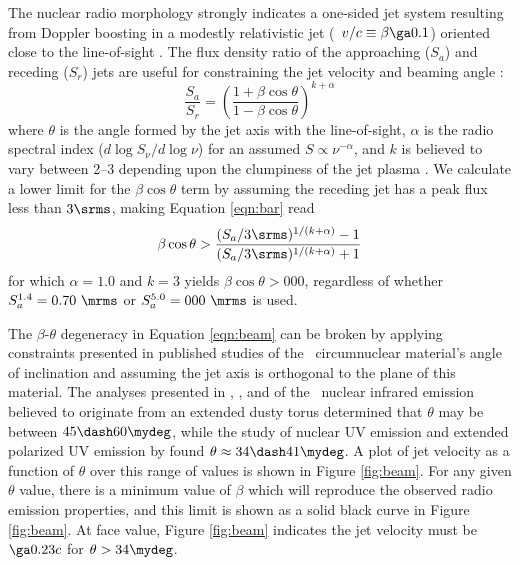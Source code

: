 \documentclass[11pt, preprint]{aastex}
\begin{document}
The nuclear radio morphology strongly indicates a one-sided jet system
resulting from Doppler boosting in a modestly relativistic jet
(\ie\ $v/c \equiv \beta \ga 0.1$) oriented close to the line-of-sight
\citep[see][for a review]{1995PASP..107..803U}. The flux density ratio
of the approaching ($S_a$) and receding ($S_r$) jets are useful for
constraining the jet velocity and beaming angle
\citep{1999ARA&A..37..409M}:
\begin{equation}
  \frac{S_a}{S_r} = \left(\frac{1+\beta \cos \theta}{1-\beta \cos
    \theta}\right)^{k+\alpha}
  \label{eqn:bar}
\end{equation}
where $\theta$ is the angle formed by the jet axis with the
line-of-sight, $\alpha$ is the radio spectral index ($d\log
S_{\nu}/d\log \nu$) for an assumed $S \propto \nu^{-\alpha}$, and $k$
is believed to vary between 2--3 depending upon the clumpiness of the
jet plasma \citep[\eg][]{1979Natur.277..182S}. We calculate a lower
limit for the $\beta \cos \theta$ term by assuming the receding jet
has a peak flux less than $3\srms$, making Equation \ref{eqn:bar} read
\begin{equation}
  \beta \cos \theta >
  \frac{(S_a/3\srms)^{1/(k+\alpha)}-1}{(S_a/3\srms)^{1/(k+\alpha)}+1}
  \label{eqn:beam}
\end{equation}
for which $\alpha = 1.0$ and $k = 3$ yields $\beta \cos \theta > 000$,
regardless of whether $S_a^{1.4} = 0.70 ~\mrms$ or $S_a^{5.0} = 000
~\mrms$ is used.

The $\beta$-$\theta$ degeneracy in Equation \ref{eqn:beam} can be
broken by applying constraints presented in published studies of the
\irs\ circumnuclear material's angle of inclination and assuming the
jet axis is orthogonal to the plane of this material. The analyses
presented in \citet{1996ApJ...460L..11G}, \citet{1997A&A...318L...1T},
and \citet{2000AJ....120..562T} of the \irs\ nuclear infrared emission
believed to originate from an extended dusty torus determined that
$\theta$ may be between $45 \dash 60\mydeg$, while the study of
nuclear UV emission and extended polarized UV emission by
\citet{1999ApJ...512..145H} found $\theta \approx 34 \dash
41\mydeg$. A plot of jet velocity as a function of $\theta$ over this
range of values is shown in Figure \ref{fig:beam}. For any given
$\theta$ value, there is a minimum value of $\beta$ which will
reproduce the observed radio emission properties, and this limit is
shown as a solid black curve in Figure \ref{fig:beam}. At face value,
Figure \ref{fig:beam} indicates the jet velocity must be $\ga 0.23c$
for $\theta > 34\mydeg$.
\end{document}

